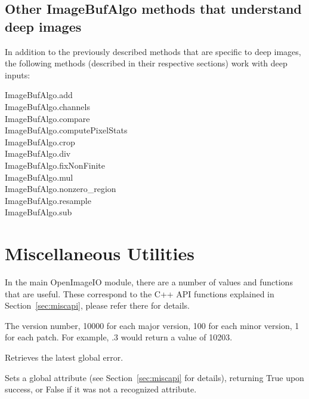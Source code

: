\subsection*{Other ImageBufAlgo methods that understand deep images}

In addition to the previously described methods that are specific to
deep images, the following \ImageBufAlgo methods (described in their
respective sections) work with deep inputs:

\medskip

\noindent
{\cf ImageBufAlgo.add} \\
{\cf ImageBufAlgo.channels} \\
{\cf ImageBufAlgo.compare} \\
{\cf ImageBufAlgo.computePixelStats} \\
{\cf ImageBufAlgo.crop} \\
{\cf ImageBufAlgo.div} \\
{\cf ImageBufAlgo.fixNonFinite} \\
{\cf ImageBufAlgo.mul} \\
{\cf ImageBufAlgo.nonzero_region} \\
{\cf ImageBufAlgo.resample} \\
{\cf ImageBufAlgo.sub} \\


\newpage
\section{Miscellaneous Utilities}
\label{sec:pythonmiscapi}

In the main {\cf OpenImageIO} module, there are a number of values and
functions that are useful.  These correspond to the C++ API functions
explained in Section~\ref{sec:miscapi}, please refer there for details.

The \product version number, 10000 for each
major version, 100 for each minor version, 1 for each patch.  For
example, .3 would return a value of 10203.
\apiend

Retrieves the latest global error.
\apiend

Sets a global attribute (see Section~\ref{sec:miscapi} for details),
returning {\cf True} upon success, or {\cf False} if it was not a
recognized attribute.  

